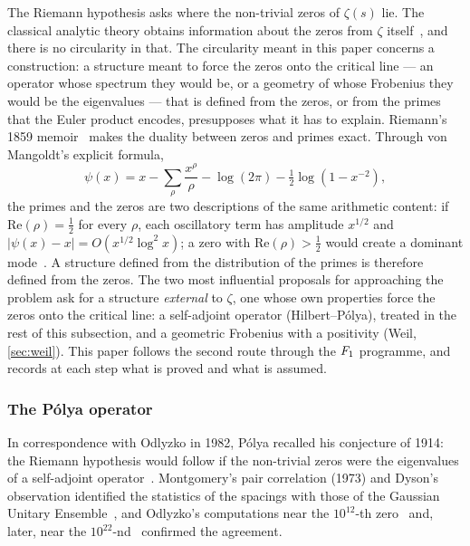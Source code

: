 The Riemann hypothesis asks where the non-trivial zeros of $\zeta(s)$ lie.  The classical analytic theory obtains
information about the zeros from $\zeta$ itself~\cite{titchmarsh86}, and there is no circularity in that.  The
circularity meant in this paper concerns a construction: a structure meant to force the zeros onto the critical
line --- an operator whose spectrum they would be, or a geometry of whose Frobenius they would be the eigenvalues
--- that is defined from the zeros, or from the primes that the Euler product encodes, presupposes what it has to
explain.  Riemann's 1859 memoir~\cite{riemann1859} makes the duality between zeros and primes exact.  Through von
Mangoldt's explicit formula,
\begin{equation}\label{eq:explicit-formula}
  \psi(x) = x - \sum_\rho \frac{x^\rho}{\rho}
    - \log(2\pi) - \tfrac12\log(1-x^{-2}),
\end{equation}
the primes and the zeros are two descriptions of the same arithmetic content:
if $\mathrm{Re}(\rho)=\tfrac12$ for every $\rho$, each oscillatory term has
amplitude $x^{1/2}$ and $|\psi(x)-x| = O(x^{1/2}\log^2 x)$; a zero with
$\mathrm{Re}(\rho)>\tfrac12$ would create a dominant mode~\cite{titchmarsh86}.
A structure defined from the distribution of the primes is therefore defined from the zeros.  The two most
influential proposals for approaching the problem ask for a structure \emph{external} to $\zeta$, one whose own
properties force the zeros onto the critical line: a self-adjoint operator (Hilbert--P\'olya), treated in the rest
of this subsection, and a geometric Frobenius with a positivity (Weil, \cref{sec:weil}).  This paper follows the
second route through the $F_1$ programme, and records at each step what is proved and what is assumed.

\subsubsection{The P\'olya operator}\label{sec:polya-hist}

In correspondence with Odlyzko in 1982, P\'olya recalled his conjecture of
1914: the Riemann hypothesis would follow if the non-trivial zeros were the
eigenvalues of a self-adjoint operator~\cite{polya1982letter,odlyzko87}.
Montgomery's pair correlation (1973) and Dyson's observation identified the
statistics of the spacings with those of the Gaussian Unitary
Ensemble~\cite{dyson62,montgomery73}, and Odlyzko's computations near the $10^{12}$-th zero~\cite{odlyzko87} and, later, near the $10^{22}$-nd~\cite{odlyzko01} confirmed the agreement.

